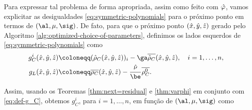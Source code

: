 


Para expressar tal problema de forma apropriada,  assim
como feito com $\hat{\varphi}$, vamos explicitar as desigualdades   \eqref{eq:symmetric-polynomials}
 para o próximo ponto em termos de $(\al,\mu,\sig)$.
De fato,  para que o próximo ponto $(\hat{x},\hat{y},\hat{z}) $ gerado pelo Algoritmo \ref{alg:optimized-choice-of-parameters}, definimos os lados esquerdos de  \eqref{eq:symmetric-polynomials} como
\begin{subequations}
\label{eq:def-g_C+g_L}
\begin{align}
	g_C^i(\nextx,\nexty,\nextz) & \coloneqq (\nextrho_C(\nextx,\nexty,\nextz))_i - \ga\dbvec{\nextrho_C}(\nextx,\nexty,\nextz), \quad i = 1,\ldots,n, \label{eq:def-g_C}\\ 
	g_L(\nextx,\nexty,\nextz)  & \coloneqq \dbvec{\rho_C}(\nextx,\nexty,\nextz)  - \frac{\nextnu}{\be} \dbvec{\rho_C^0}. \label{eq:def-g_L}
\end{align}
\end{subequations}

Assim, usando os Teoremas \ref{thm:next=residual} e  \ref{thm:varphi} em conjunto com \eqref{eq:def-g_C}, obtemos $g_C^{i}$, para $i=1,\ldots,n$, em função de $(\al,\mu,\sig)$ como 


